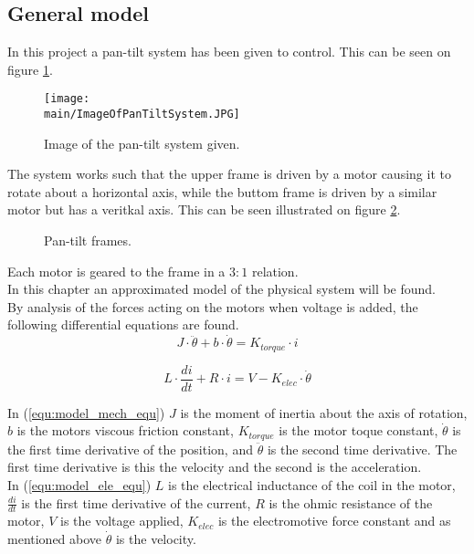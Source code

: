 \documentclass[../../main]{subfiles}
\begin{document}
\subsection{General model}
\label{ch:General_model}

In this project a pan-tilt system has been given to control. This can be seen on figure \ref{fig:ImageOfPanTiltSystem}.

\begin{figure}[h]
  \centering
  \texttt{[image: \\main/ImageOfPanTiltSystem.JPG]}
  \caption{Image of the pan-tilt system given.}
  \label{fig:ImageOfPanTiltSystem}
\end{figure}

The system works such that the upper frame is driven by a motor causing it to rotate about a horizontal axis, while the buttom frame is driven by a similar motor but has a veritkal axis. This can be seen illustrated on figure \ref{fig:pan-tilt_frames}.

  \begin{figure}[h]
    \centering
  \def\svgwidth{0.4\columnwidth}
  \qquad
  \def\svgwidth{0.2\columnwidth}
  \caption{Pan-tilt frames.}
  \label{fig:pan-tilt_frames}
  \end{figure}

Each motor is geared to the frame in a $3:1$ relation.\\

In this chapter an approximated model of the physical system will be found.\\

By analysis of the forces acting on the motors when voltage is added, the following differential equations are found.\\

\begin{equation}
  \label{equ:model_mech_equ}
  J\cdot \ddot \theta + b\cdot \dot \theta = K_{torque}\cdot i
\end{equation}

\begin{equation}
  \label{equ:model_ele_equ}
  L\cdot \frac{di}{dt} + R\cdot i = V - K_{elec}\cdot \dot \theta
\end{equation}

In (\ref{equ:model_mech_equ}) $J$ is the moment of inertia about the axis of rotation, $b$ is the motors viscous friction constant, $K_{torque}$ is the motor toque constant, $\dot \theta$ is the first time derivative of the position, and $\ddot \theta$ is the second time derivative. The first time derivative is this the velocity and the second is the acceleration.\\
In (\ref{equ:model_ele_equ}) $L$ is the electrical inductance of the coil in the motor, $\frac{di}{dt}$ is the first time derivative of the current, $R$ is the ohmic resistance of the motor, $V$ is the voltage applied, $K_{elec}$ is the electromotive force constant and as mentioned above $\dot \theta$ is the velocity.\\
\end{document}
